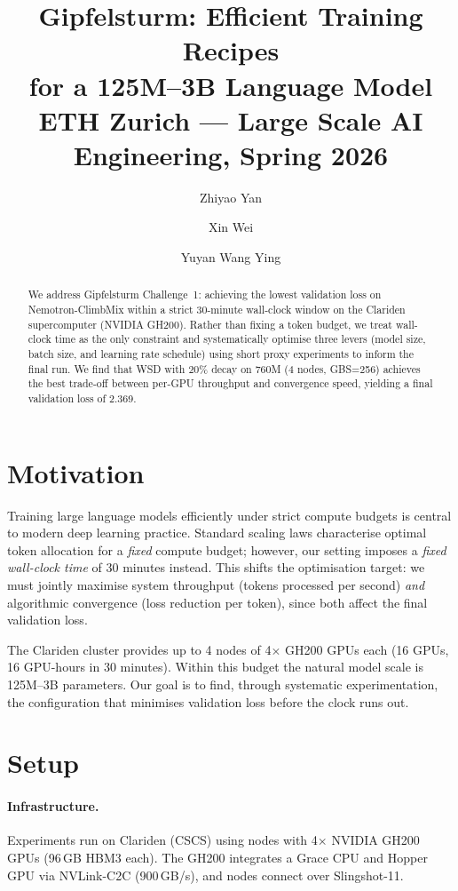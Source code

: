 \documentclass[10pt,twocolumn]{article}
\title{\textbf{Gipfelsturm: Efficient Training Recipes\\for a 125M--3B Language Model}\\[0.5em]
\large ETH Zurich --- Large Scale AI Engineering, Spring 2026}
\author{
  Zhiyao Yan \and
  Xin Wei \and
  Yuyan Wang Ying
}
\date{}
\begin{document}
\maketitle

\begin{abstract}
We address Gipfelsturm Challenge~1: achieving the lowest validation loss on
Nemotron-ClimbMix within a strict 30-minute wall-clock window on the Clariden
supercomputer (NVIDIA GH200). Rather than fixing a token budget, we treat
wall-clock time as the only constraint and systematically optimise three
levers (model size, batch size, and learning rate schedule) using short
proxy experiments to inform the final run. We find that WSD with 20\% decay on 760M (4 nodes, GBS=256) achieves the best trade-off between
per-GPU throughput and convergence speed, yielding a final validation loss of
2.369.
\end{abstract}

\section{Motivation}

Training large language models efficiently under strict compute budgets is
central to modern deep learning practice. Standard scaling laws
\cite{chinchilla} characterise optimal token allocation for a \emph{fixed}
compute budget; however, our setting imposes a \emph{fixed wall-clock time}
of 30 minutes instead. This shifts the optimisation target: we must jointly
maximise system throughput (tokens processed per second) \emph{and}
algorithmic convergence (loss reduction per token), since both affect the
final validation loss.

The Clariden cluster provides up to 4 nodes of 4$\times$ GH200 GPUs each
(16 GPUs, 16 GPU-hours in 30 minutes). Within this budget the natural model
scale is 125M--3B parameters. Our goal is to find,
through systematic experimentation, the configuration that minimises
validation loss before the clock runs out.

\section{Setup}

\paragraph{Infrastructure.}
Experiments run on Clariden (CSCS) using nodes with 4$\times$ NVIDIA GH200
GPUs (96\,GB HBM3 each). The GH200 integrates a Grace CPU and Hopper GPU
via NVLink-C2C (900\,GB/s), and nodes connect over Slingshot-11.
\end{document}
